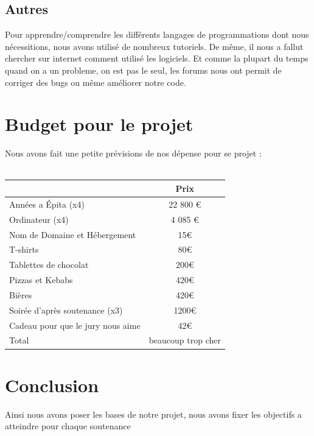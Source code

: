 \documentclass [11pt]{report}
\begin{document}
	\section {Autres}

	Pour apprendre/comprendre les différents langages de programmations dont nous nécessitions, nous avons utilisé de nombreux tutoriels. De même, il nous a fallut chercher sur internet comment utilisé les logiciels. Et comme la plupart du temps quand on a un probleme, on est pas le seul, les forums nous ont permit de corriger des bugs ou même améliorer notre code.


\chapter {Budget pour le projet}
	Nous avons fait une petite prévisions de nos dépense pour se projet :\\\\

				\begin{tabular}{|l|c|}
				\hline
		 		 & Prix \\
				\hline
				Années a \'Epita (x4) & 22 800 € \\
				\hline
				Ordinateur (x4) & 4 085 €  \\
				\hline
				Nom de Domaine et Hébergement &  15€ \\
				\hline
				T-shirts & 80€ \\
				\hline
				Tablettes de chocolat & 200€ \\
				\hline
				Pizzas et Kebabs & 420€  \\
				\hline
				Bières  & 420€   \\
	          			 \hline
				Soirée d'après soutenance (x3) & 1200€\\
				\hline 
				Cadeau pour que le jury nous aime & 42€ \\
				\hline
				Total & beaucoup trop cher \\
				\hline
				
			\end{tabular}
\chapter {Conclusion}
	Ainsi nous avons poser les bases de notre projet, nous avons fixer les objectifs a atteindre pour chaque soutenance
\end{document}
